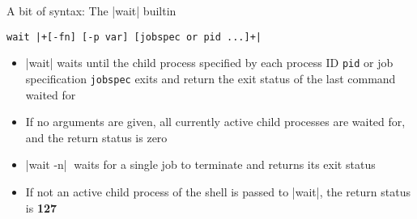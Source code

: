 \begin{frame}[fragile]{A bit of syntax: The \bash|wait| builtin}
    \vspace{-1mm}
    \begin{overlayarea}{\textwidth}{0.7\textheight}
        \begin{lstlisting}[style=MyBash, numbers=none, belowskip=-6mm]
            wait |+[-fn] [-p var] [jobspec or pid ...]+|
        \end{lstlisting}
        \begin{itemize}
            \item \alert<3>{\bash|wait| waits until the child process specified by each process ID \texttt{pid} or job specification \texttt{jobspec} exits and return the exit status of the last command waited for}
            \item \alert<2>{If no arguments are given, all currently active child processes are waited for, and the return status is zero}
            \item \alert<4>{\bash|wait -n|$\;$ waits for a single job to terminate and returns its exit status}
            \item \alert<5>{If not an active child process of the shell is passed to \bash|wait|, the return status is \textbf{127}}
        \end{itemize}
        \vspace{-2mm}

\end{overlayarea}
\end{frame}
